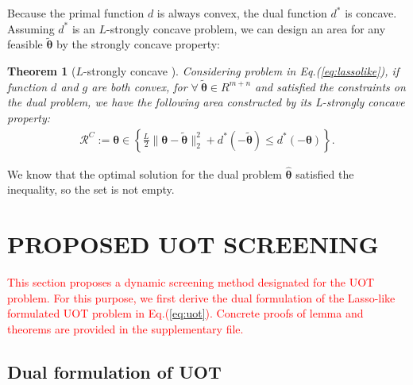 \documentclass[twoside]{article}
\theoremstyle{plain}
\newtheorem{thm}{Theorem}
\renewcommand{\vec}[1]{\bm{#1}}
\newcommand{\changeHK}[1]{\textcolor{red}{#1}}
\begin{document}
Because the primal function $d$ is always convex, the dual function $d^*$ is concave. Assuming $d^*$ is an $L$-strongly concave problem, we can design an area for any feasible $\tilde{\vec{\theta}}$ by the strongly concave property:

\begin{thm}[$L$-strongly concave \changeHK{\citep[Theorem 5]{NEURIPS2021_7b5b23f4}}]\label{circle}
Considering problem in Eq.(\ref{eq:lassolike}), if function $d$ and $g$ are both convex, for $\forall \ \tilde{\vec{\theta}} \in{R^{m+n}}$ and satisfied the constraints on the dual problem, we have the following area constructed by its L-strongly concave property:  
$$
\begin{aligned}
\mathcal{R}^{C}:=\vec{\theta} \in \left\{\frac{L}{2}\|\vec{\theta}-\tilde{\vec{\theta}}\|_2^2+d^*(-\tilde{\vec{\theta}}) \leq d^*(-\vec{\theta})\right\}.
\end{aligned}
$$
\end{thm}

We know that the optimal solution for the dual problem $\hat{\vec{\theta}}$ satisfied the inequality, so the set is not empty.



\section{PROPOSED UOT SCREENING}

\changeHK{This section proposes a dynamic screening method designated for the UOT problem. For this purpose, we first derive the dual formulation of the Lasso-like formulated UOT problem in Eq.(\ref{eq:uot}). Concrete proofs of lemma and theorems are provided in the supplementary file.}


\subsection{Dual formulation of UOT}
\end{document}
